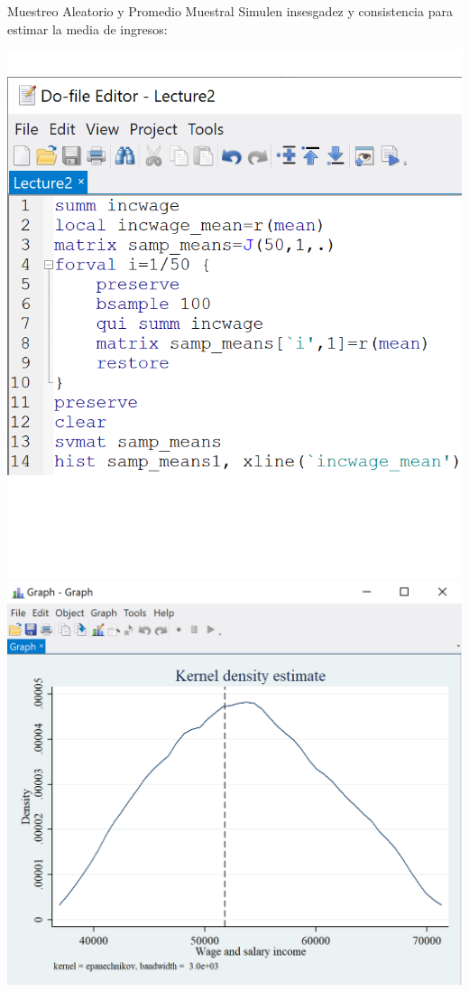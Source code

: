 \documentclass[11pt,handout,aspectratio=169]{beamer}
\begin{document}
\begin{frame}{Muestreo Aleatorio y Promedio Muestral}
\vspace{0.2cm}
Simulen insesgadez  y consistencia para estimar la media de ingresos:

\begin{center}
\includegraphics[scale=0.45]{stata18.png} \includegraphics[scale=0.5]{stata22.png}
\end{center}

\end{frame}
\end{document}
